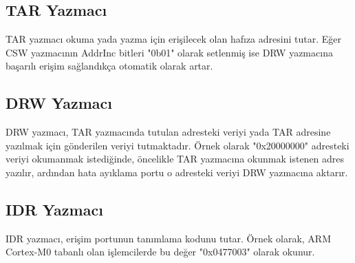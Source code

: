 \subsection{TAR Yazmacı}

TAR yazmacı okuma yada yazma için erişilecek olan hafıza adresini tutar. Eğer CSW yazmacının AddrInc bitleri "0b01" olarak setlenmiş ise
DRW yazmacına başarılı erişim sağlandıkça otomatik olarak artar.

\subsection{DRW Yazmacı}

DRW yazmacı, TAR yazmacında tutulan adresteki veriyi yada TAR adresine yazılmak için gönderilen veriyi tutmaktadır. Örnek olarak "0x20000000" adresteki veriyi
okumanmak istediğinde, öncelikle TAR yazmacına okunmak istenen adres yazılır, ardından hata ayıklama portu o adresteki veriyi DRW yazmacına aktarır.


\subsection{IDR Yazmacı}

IDR yazmacı, erişim portunun tanımlama kodunu tutar. Örnek olarak, ARM Cortex-M0 tabanlı olan işlemcilerde bu değer "0x0477003" olarak okunur.
